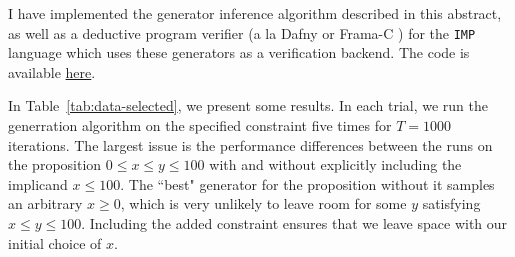 \documentclass[sigconf,nonacm,review,anonymous]{acmart}
\begin{document}
I have implemented the generator inference algorithm described in this abstract,
as well as a deductive program verifier (a la Dafny or Frama-C \cite{dafny,framac}) for the
\texttt{IMP} language which uses these generators as a verification backend.
The code is available \href{https://github.com/jdublu10/triple-testing}{here}.

In Table~\ref{tab:data-selected}, we present some results.
In each trial, we run the generration algorithm on the specified constraint five
times for $T = 1000$ iterations. The largest issue is the performance
differences between the runs on the proposition $0 \leq x \leq y \leq 100$ with
and without explicitly including the implicand $x \leq 100$.
The ``best" generator for the proposition without it samples an
arbitrary $x \geq 0$, which is very unlikely to leave room for some $y$
satisfying $x \leq y \leq 100$. Including the added constraint ensures that we leave space
with our initial choice of $x$.


\begin{table}[h]
\label{tab:data-selected}
\centering
{}
\end{table}
\end{document}
